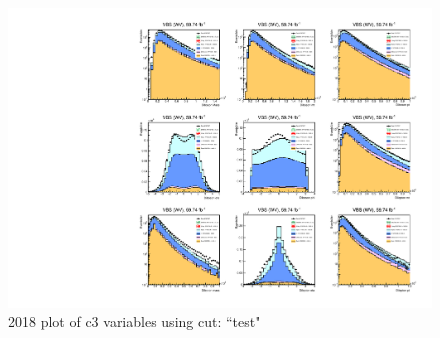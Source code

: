 \documentclass{article}
\begin{document}
                        \begin{figure}[H]
                            \centering
                            \caption{2018 plot of c3 variables using cut: ``test"}
                            \includegraphics[width=\textwidth]{2018/c3_2018_test.pdf}
                        \end{figure}    
\end{document}
